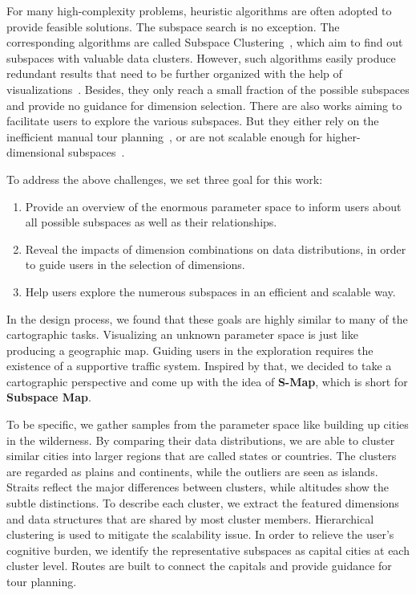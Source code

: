 For many high-complexity problems, heuristic algorithms are often adopted to provide feasible solutions. The subspace search is no exception. The corresponding algorithms are called Subspace Clustering~\cite{DBLP:journals/sigkdd/ParsonsHL04, DBLP:journals/spm/Vidal11}, which aim to find out subspaces with valuable data clusters. However, such algorithms easily produce redundant results that need to be further organized with the help of visualizations~\cite{DBLP:conf/ieeevast/TatuMFBSSK12, jackle2017pattern}. Besides, they only reach a small fraction of the possible subspaces and provide no guidance for dimension selection.
There are also works aiming to facilitate users to explore the various subspaces. But they either rely on the inefficient manual tour planning~\cite{DBLP:journals/tvcg/ElmqvistDF08, DBLP:journals/tvcg/YuanRWG13}, or are not scalable enough for higher-dimensional subspaces~\cite{DBLP:conf/apvis/NhonW14}.

To address the above challenges, we set three goal for this work:
\begin{enumerate} 
\item Provide an overview of the enormous parameter space to inform users about all possible subspaces as well as their relationships.
\item Reveal the impacts of dimension combinations on data distributions, in order to guide users in the selection of dimensions.
\item Help users explore the numerous subspaces in an efficient and scalable way.
\end{enumerate}
In the design process, we found that these goals are highly similar to many of the cartographic tasks. Visualizing an unknown parameter space is just like producing a geographic map. Guiding users in the exploration requires the existence of a supportive traffic system. Inspired by that, we decided to take a cartographic perspective and come up with the idea of \textbf{S-Map}, which is short for \textbf{Subspace Map}.

To be specific, we gather samples from the parameter space like building up cities in the wilderness. By comparing their data distributions, we are able to cluster similar cities into larger regions that are called states or countries. The clusters are regarded as plains and continents, while the outliers are seen as islands. Straits reflect the major differences between clusters, while altitudes show the subtle distinctions. To describe each cluster, we extract the featured dimensions and data structures that are shared by most cluster members. Hierarchical clustering is used to mitigate the scalability issue. In order to relieve the user's cognitive burden, we identify the representative subspaces as capital cities at each cluster level. Routes are built to connect the capitals and provide guidance for tour planning.

